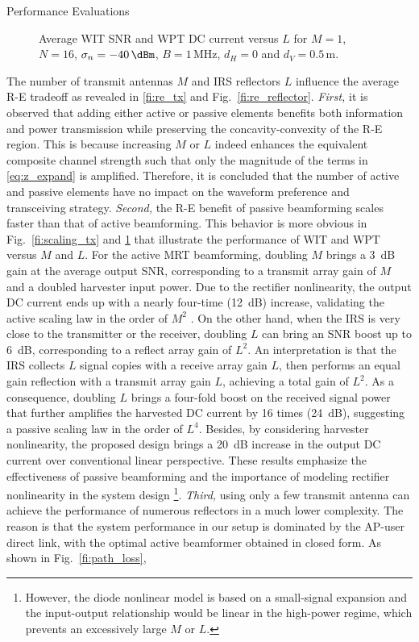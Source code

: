 \documentclass[journal]{IEEEtran}
\begin{document}
\begin{section}{Performance Evaluations}
		\begin{figure}[!t]
			\centering
			\begin{adjustbox}{width=\linewidth}
				
			\end{adjustbox}
			\caption{Average WIT SNR and WPT DC current versus $L$ for $M=1$, $N=16$, $\sigma_n=-40\,\si{\dBm}$, $B=1\,\si{\MHz}$, $d_H=0$ and $d_V=0.5\,\si{\meter}$.}
			\label{fi:scaling_reflector}
		\end{figure}

		The number of transmit antennas $M$ and IRS reflectors $L$ influence the average R-E tradeoff as revealed in \ref{fi:re_tx} and Fig.~\ref{fi:re_reflector}. \textit{First,} it is observed that adding either active or passive elements benefits both information and power transmission while preserving the concavity-convexity of the R-E region. This is because increasing $M$ or $L$ indeed enhances the equivalent composite channel strength such that only the magnitude of the terms in \eqref{eq:z_expand} is amplified. Therefore, it is concluded that the number of active and passive elements have no impact on the waveform preference and transceiving strategy. \textit{Second,} the R-E benefit of passive beamforming scales faster than that of active beamforming. This behavior is more obvious in Fig.~\ref{fi:scaling_tx} and \ref{fi:scaling_reflector} that illustrate the performance of WIT and WPT versus $M$ and $L$. For the active MRT beamforming, doubling $M$ brings a \SI{3}{\dB} gain at the average output SNR, corresponding to a transmit array gain of $M$ and a doubled harvester input power. Due to the rectifier nonlinearity, the output DC current ends up with a nearly four-time (\SI{12}{\dB}) increase, validating the active scaling law in the order of $M^2$ \cite{Clerckx2016a}. On the other hand, when the IRS is very close to the transmitter or the receiver, doubling $L$ can bring an SNR boost up to \SI{6}{\dB}, corresponding to a reflect array gain of $L^2$. An interpretation is that the IRS collects $L$ signal copies with a receive array gain $L$, then performs an equal gain reflection with a transmit array gain $L$, achieving a total gain of $L^2$. As a consequence, doubling $L$ brings a four-fold boost on the received signal power that further amplifies the harvested DC current by 16 times (\SI{24}{\dB}), suggesting a passive scaling law in the order of $L^4$. Besides, by considering harvester nonlinearity, the proposed design brings a \SI{20}{\dB} increase in the output DC current over conventional linear perspective. These results emphasize the effectiveness of passive beamforming and the importance of modeling rectifier nonlinearity in the system design \footnote{However, the diode nonlinear model is based on a small-signal expansion and the input-output relationship would be linear in the high-power regime, which prevents an excessively large $M$ or $L$.}. \textit{Third,} using only a few transmit antenna can achieve the performance of numerous reflectors in a much lower complexity. The reason is that the system performance in our setup is dominated by the AP-user direct link, with the optimal active beamformer obtained in closed form. As shown in Fig.~\ref{fi:path_loss}, 
\end{section}
\end{document}
